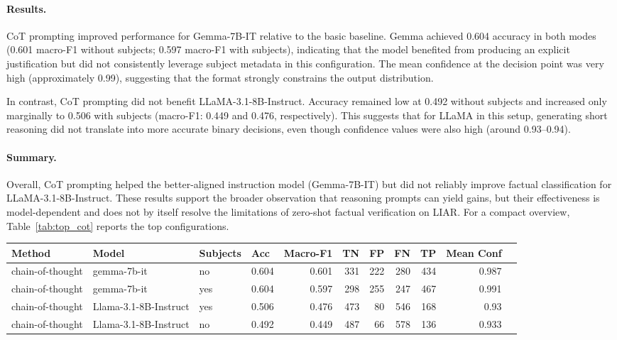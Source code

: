 \paragraph{Results.}
CoT prompting improved performance for Gemma-7B-IT relative to the basic baseline. Gemma achieved 0.604 accuracy in both modes (0.601 macro-F1 without subjects; 0.597 macro-F1 with subjects), indicating that the model benefited from producing an explicit justification but did not consistently leverage subject metadata in this configuration. The mean confidence at the decision point was very high (approximately 0.99), suggesting that the format strongly constrains the output distribution.

In contrast, CoT prompting did not benefit LLaMA-3.1-8B-Instruct. Accuracy remained low at 0.492 without subjects and increased only marginally to 0.506 with subjects (macro-F1: 0.449 and 0.476, respectively). This suggests that for LLaMA in this setup, generating short reasoning did not translate into more accurate binary decisions, even though confidence values were also high (around 0.93--0.94).

\paragraph{Summary.}
Overall, CoT prompting helped the better-aligned instruction model (Gemma-7B-IT) but did not reliably improve factual classification for LLaMA-3.1-8B-Instruct. These results support the broader observation that reasoning prompts can yield gains, but their effectiveness is model-dependent and does not by itself resolve the limitations of zero-shot factual verification on LIAR. For a compact overview, Table~\ref{tab:top_cot} reports the top configurations.

\begin{minipage}{\linewidth}
\centering
{}
\label{tab:top_cot}
\scriptsize
\begin{tabular}{l l l l r r r r r r r}
\toprule
Method & Model & Subjects & Acc & Macro-F1 & TN & FP & FN & TP & Mean Conf \\
\midrule
chain-of-thought & gemma-7b-it           & no  & 0.604 & 0.601 & 331 & 222 & 280 & 434 & 0.987 \\
chain-of-thought & gemma-7b-it           & yes & 0.604 & 0.597 & 298 & 255 & 247 & 467 & 0.991 \\
chain-of-thought & Llama-3.1-8B-Instruct & yes & 0.506 & 0.476 & 473 &  80 & 546 & 168 & 0.93  \\
chain-of-thought & Llama-3.1-8B-Instruct & no  & 0.492 & 0.449 & 487 &  66 & 578 & 136 & 0.933 \\
\bottomrule
\end{tabular}
\end{minipage}

